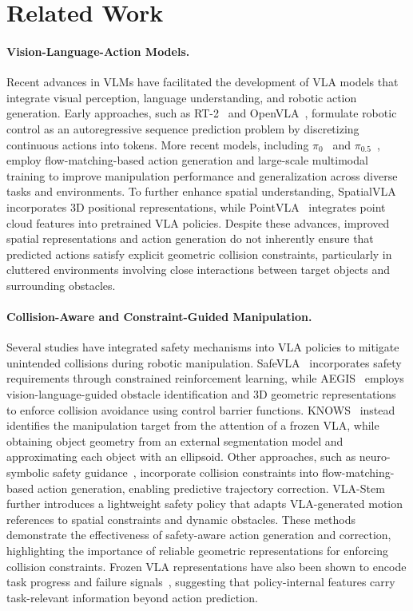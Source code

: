 \section{Related Work}
\label{sec:related}
\paragraph{Vision-Language-Action Models.}
Recent advances in VLMs have facilitated the development of VLA models that integrate visual perception, language understanding, and robotic action generation. Early approaches, such as RT-2~\cite{zitkovich2023rt2} and OpenVLA~\cite{kim2024openvla}, formulate robotic control as an autoregressive sequence prediction problem by discretizing continuous actions into tokens. More recent models, including $\pi_0$~\cite{black2024pi0} and $\pi_{0.5}$~\cite{intelligence2025pi05}, employ flow-matching-based action generation and large-scale multimodal training to improve manipulation performance and generalization across diverse tasks and environments. To further enhance spatial understanding, SpatialVLA~\cite{qu2025spatialvla} incorporates 3D positional representations, while PointVLA~\cite{li2025pointvla} integrates point cloud features into pretrained VLA policies. Despite these advances, improved spatial representations and action generation do not inherently ensure that predicted actions satisfy explicit geometric collision constraints, particularly in cluttered environments involving close interactions between target objects and surrounding obstacles.

\paragraph{Collision-Aware and Constraint-Guided Manipulation.}
Several studies have integrated safety mechanisms into VLA policies to mitigate unintended collisions during robotic manipulation. SafeVLA~\cite{zhang2025safevla} incorporates safety requirements through constrained reinforcement learning, while AEGIS~\cite{hu2026vlsa} employs vision-language-guided obstacle identification and 3D geometric representations to enforce collision avoidance using control barrier functions. KNOWS~\cite{park2026knows} instead identifies the manipulation target from the attention of a frozen VLA, while obtaining object geometry from an external segmentation model and approximating each object with an ellipsoid. Other approaches, such as neuro-symbolic safety guidance~\cite{english2026constrainedfm}, incorporate collision constraints into flow-matching-based action generation, enabling predictive trajectory correction. VLA-Stem~\cite{zou2026vlastem} further introduces a lightweight safety policy that adapts VLA-generated motion references to spatial constraints and dynamic obstacles. These methods demonstrate the effectiveness of safety-aware action generation and correction, highlighting the importance of reliable geometric representations for enforcing collision constraints. Frozen VLA representations have also been shown to encode task progress and failure signals~\cite{bhardwaj2026progress,gu2025safe}, suggesting that policy-internal features carry task-relevant information beyond action prediction.

